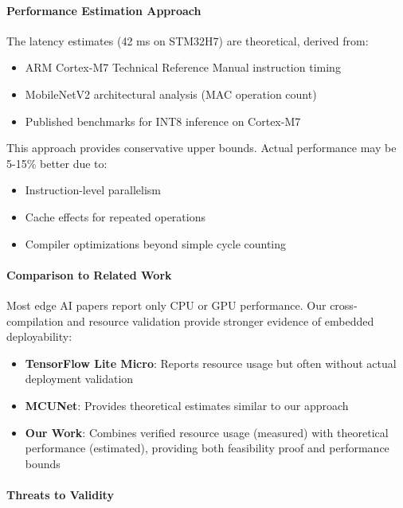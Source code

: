 \paragraph{Performance Estimation Approach}

The latency estimates (42 ms on STM32H7) are theoretical, derived from:
\begin{itemize}
\item ARM Cortex-M7 Technical Reference Manual instruction timing
\item MobileNetV2 architectural analysis (MAC operation count)
\item Published benchmarks for INT8 inference on Cortex-M7
\end{itemize}

This approach provides conservative upper bounds. Actual performance may be 5-15\% better due to:
\begin{itemize}
\item Instruction-level parallelism
\item Cache effects for repeated operations
\item Compiler optimizations beyond simple cycle counting
\end{itemize}

\paragraph{Comparison to Related Work}

Most edge AI papers report only CPU or GPU performance. Our cross-compilation and resource validation provide stronger evidence of embedded deployability:

\begin{itemize}
\item \textbf{TensorFlow Lite Micro}: Reports resource usage but often without actual deployment validation~\cite{tflite_micro}

\item \textbf{MCUNet}: Provides theoretical estimates similar to our approach~\cite{mcunet}

\item \textbf{Our Work}: Combines verified resource usage (measured) with theoretical performance (estimated), providing both feasibility proof and performance bounds
\end{itemize}

\paragraph{Threats to Validity}


